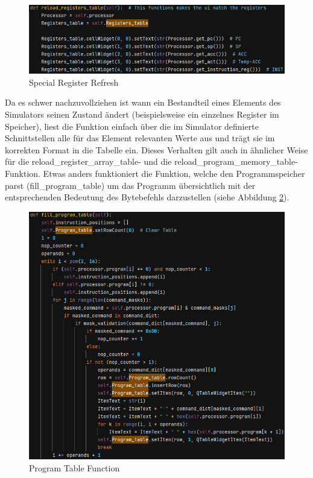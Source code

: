 \documentclass[12pt]{article}
\newcommand{\imgSpaceBefore}{\vspace{10pt}}
\begin{document}
\begin{figure}[H]
\centering
\includegraphics[width=14cm]{bilder/reloadRegs}
\caption{Special Register Refresh}
\label{fig:reloadRegs}
\end{figure}

\noindent
Da es schwer nachzuvollziehen ist wann ein Bestandteil eines Elements des Simulators seinen Zustand ändert (beispielsweise ein einzelnes Register im Speicher), liest die Funktion einfach über die im Simulator definierte Schnittstellen alle für das Element relevanten Werte aus und trägt sie im korrekten Format in die Tabelle ein. Dieses Verhalten gilt auch in ähnlicher Weise für die \glqq reload\_register\_array\_table\grqq- und die \glqq reload\_program\_memory\_table\grqq-Funktion. Etwas anders funktioniert die Funktion, welche den Programmspeicher parst (\glqq fill\_program\_table\grqq) um das Programm übersichtlich mit der entsprechenden Bedeutung des Bytebefehls darzustellen (siehe Abbildung \ref{fig:FillProgReg}).\imgSpaceBefore

\begin{figure}[H]
\centering
\includegraphics[width=14cm]{bilder/FillProgTable}
\caption{Program Table Function}
\label{fig:FillProgReg}
\end{figure}
\end{document}
